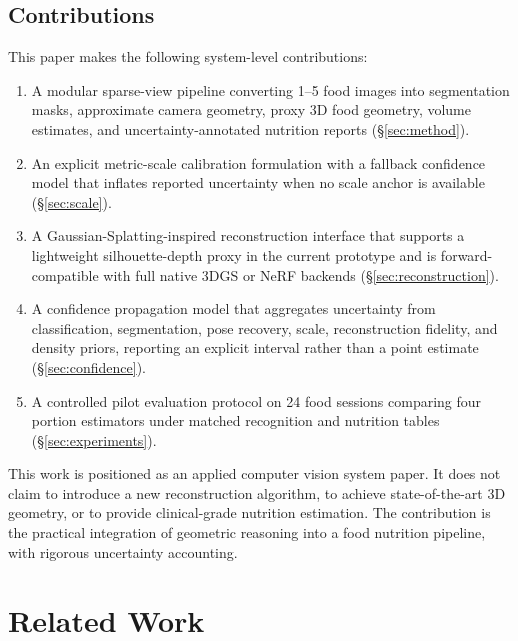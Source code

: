 \documentclass[conference]{IEEEtran}
\begin{document}
\subsection{Contributions}

This paper makes the following system-level contributions:

\begin{enumerate}
    \item A modular sparse-view pipeline converting 1--5 food images into
          segmentation masks, approximate camera geometry, proxy 3D food
          geometry, volume estimates, and uncertainty-annotated nutrition
          reports (\S\ref{sec:method}).

    \item An explicit metric-scale calibration formulation with a
          fallback confidence model that inflates reported uncertainty when
          no scale anchor is available (\S\ref{sec:scale}).

    \item A Gaussian-Splatting-inspired reconstruction interface that
          supports a lightweight silhouette-depth proxy in the current
          prototype and is forward-compatible with full native 3DGS or NeRF
          backends (\S\ref{sec:reconstruction}).

    \item A confidence propagation model that aggregates uncertainty from
          classification, segmentation, pose recovery, scale, reconstruction
          fidelity, and density priors, reporting an explicit interval rather
          than a point estimate (\S\ref{sec:confidence}).

    \item A controlled pilot evaluation protocol on 24 food sessions
          comparing four portion estimators under matched recognition and
          nutrition tables (\S\ref{sec:experiments}).
\end{enumerate}

This work is positioned as an applied computer vision system paper. It does not
claim to introduce a new reconstruction algorithm, to achieve
state-of-the-art 3D geometry, or to provide clinical-grade nutrition estimation.
The contribution is the practical integration of geometric reasoning into a food
nutrition pipeline, with rigorous uncertainty accounting.

\section{Related Work}
\end{document}
